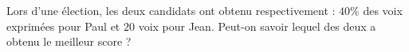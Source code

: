 
\begin{exercice}\label{exosmath-0796}

 Lors d'une élection, les deux candidats ont obtenu respectivement : $40\%$ des voix exprimées pour Paul et $20$ voix pour Jean. Peut-on savoir lequel des deux a obtenu le meilleur score ?

\end{exercice}
